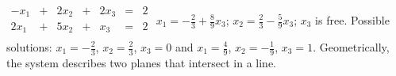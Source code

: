 {$\begin{array}{ccccccc}
-x_1&+&2x_2&+&2x_3&=&2\\
2x_1&+&5x_2&+&x_3&=&2\\
\end{array}$}
{$x_1=-\frac23+\frac89x_3$; $x_2=\frac23-\frac59x_3$; $x_3$ is free. Possible solutions: $x_1 = -\frac23$, $x_2 = \frac23$, $x_3 = 0$ and $x_1 = \frac49$, $x_2 = -\frac19$, $x_3 = 1$. Geometrically, the system describes two planes that intersect in a line.}